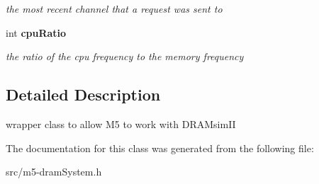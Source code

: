 \begin{CompactItemize}
\begin{CompactList}\small\item\em the most recent channel that a request was sent to \item\end{CompactList}\item 
int {\bf cpuRatio}\label{class_m5dram_system_2fbee1e022242e218e235df762bcd82a}

\begin{CompactList}\small\item\em the ratio of the cpu frequency to the memory frequency \item\end{CompactList}\end{CompactItemize}


\subsection{Detailed Description}
wrapper class to allow M5 to work with DRAMsimII 

The documentation for this class was generated from the following file:\begin{CompactItemize}
\item 
src/m5-dramSystem.h\end{CompactItemize}
